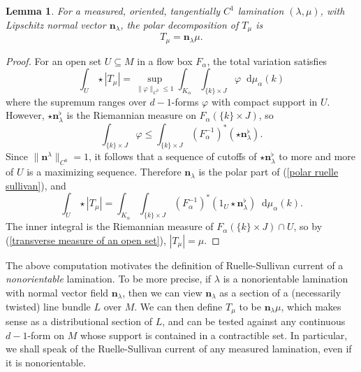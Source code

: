 \documentclass[final,12pt, leqno]{brownthesis}
\newcommand*\dif{\mathop{}\!\mathrm{d}}
\newcommand{\normal}{\mathbf n}
\newtheorem{lemma}[theorem]{Lemma}
\theoremstyle{definition}
\numberwithin{equation}{section}
\begin{document}
\begin{lemma}
For a measured, oriented, tangentially $C^1$ lamination $(\lambda, \mu)$, with Lipschitz normal vector $\normal_\lambda$, the polar decomposition of $T_\mu$ is
\begin{equation}\label{polar ruelle sullivan}
T_\mu = \normal_\lambda \mu.
\end{equation}
\end{lemma}
\begin{proof}
For an open set $U \subseteq M$ in a flow box $F_\alpha$, the total variation satisfies
$$\int_U \star |T_\mu| = \sup_{\|\varphi\|_{C^0} \leq 1} \int_{K_\alpha} \int_{\{k\} \times J} \varphi \dif \mu_\alpha(k)$$
where the supremum ranges over $d-1$-forms $\varphi$ with compact support in $U$.
However, $\star \normal_\lambda^\flat$ is the Riemannian measure on $F_\alpha(\{k\} \times J)$, so
$$\int_{\{k\} \times J} \varphi \leq \int_{\{k\} \times J} (F_\alpha^{-1})^*(\star \normal_\lambda^\flat).$$
Since $\|\normal^\lambda\|_{C^0} = 1$, it follows that a sequence of cutoffs of $\star \normal_\lambda^\flat$ to more and more of $U$ is a maximizing sequence.
Therefore $\normal_\lambda$ is the polar part of (\ref{polar ruelle sullivan}), and
$$\int_U \star |T_\mu| = \int_{K_\alpha} \int_{\{k\} \times J} (F_\alpha^{-1})^*(1_U \star \normal_\lambda^\flat) \dif \mu_\alpha(k).$$
The inner integral is the Riemannian measure of $F_\alpha(\{k\} \times J) \cap U$, so by (\ref{transverse measure of an open set}), $|T_\mu| = \mu$.
\end{proof}

The above computation motivates the definition of Ruelle-Sullivan current of a \emph{nonorientable} lamination.
To be more precise, if $\lambda$ is a nonorientable lamination with normal vector field $\normal_\lambda$, then we can view $\normal_\lambda$ as a section of a (necessarily twisted) line bundle $L$ over $M$.
We can then define $T_\mu$ to be $\normal_\lambda \mu$, which makes sense as a distributional section of $L$, and can be tested against any continuous $d-1$-form on $M$ whose support is contained in a contractible set.
In particular, we shall speak of the Ruelle-Sullivan current of any measured lamination, even if it is nonorientable.
\end{document}
